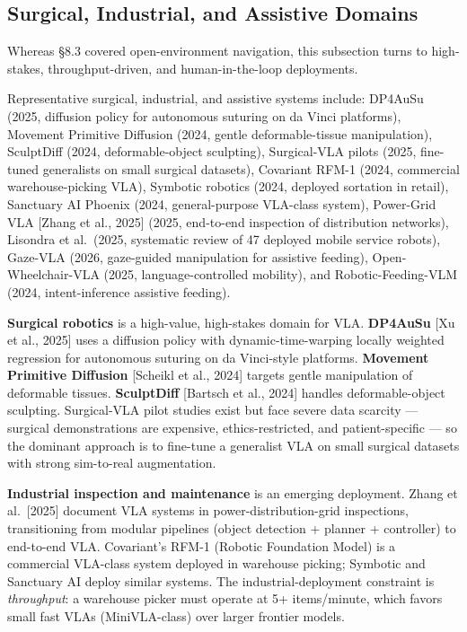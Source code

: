 \documentclass{article}
\begin{document}
\subsection{Surgical, Industrial, and Assistive Domains}\label{surgical-industrial-and-assistive-domains}

Whereas §8.3 covered open-environment navigation, this subsection turns to high-stakes, throughput-driven, and human-in-the-loop deployments.

Representative surgical, industrial, and assistive systems include: DP4AuSu (2025, diffusion policy for autonomous suturing on da Vinci platforms), Movement Primitive Diffusion (2024, gentle deformable-tissue manipulation), SculptDiff (2024, deformable-object sculpting), Surgical-VLA pilots (2025, fine-tuned generalists on small surgical datasets), Covariant RFM-1 (2024, commercial warehouse-picking VLA), Symbotic robotics (2024, deployed sortation in retail), Sanctuary AI Phoenix (2024, general-purpose VLA-class system), Power-Grid VLA {[}Zhang et al., 2025{]} (2025, end-to-end inspection of distribution networks), Lisondra et al.~(2025, systematic review of 47 deployed mobile service robots), Gaze-VLA (2026, gaze-guided manipulation for assistive feeding), Open-Wheelchair-VLA (2025, language-controlled mobility), and Robotic-Feeding-VLM (2024, intent-inference assistive feeding).

\textbf{Surgical robotics} is a high-value, high-stakes domain for VLA. \textbf{DP4AuSu} {[}Xu et al., 2025{]} uses a diffusion policy with dynamic-time-warping locally weighted regression for autonomous suturing on da Vinci-style platforms. \textbf{Movement Primitive Diffusion} {[}Scheikl et al., 2024{]} targets gentle manipulation of deformable tissues. \textbf{SculptDiff} {[}Bartsch et al., 2024{]} handles deformable-object sculpting. Surgical-VLA pilot studies exist but face severe data scarcity --- surgical demonstrations are expensive, ethics-restricted, and patient-specific --- so the dominant approach is to fine-tune a generalist VLA on small surgical datasets with strong sim-to-real augmentation.

\textbf{Industrial inspection and maintenance} is an emerging deployment. Zhang et al.~{[}2025{]} document VLA systems in power-distribution-grid inspections, transitioning from modular pipelines (object detection + planner + controller) to end-to-end VLA. Covariant's RFM-1 (Robotic Foundation Model) is a commercial VLA-class system deployed in warehouse picking; Symbotic and Sanctuary AI deploy similar systems. The industrial-deployment constraint is \emph{throughput}: a warehouse picker must operate at 5+ items/minute, which favors small fast VLAs (MiniVLA-class) over larger frontier models.
\end{document}

